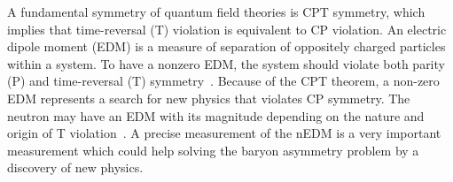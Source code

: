 
A fundamental symmetry of quantum field theories is CPT symmetry, which implies that time-reversal (T) violation is equivalent to CP violation.  An electric dipole moment (EDM) is a measure of separation of oppositely charged particles within a system. To have a nonzero EDM, the system should violate both parity (P) and time-reversal (T) symmetry~\cite{edm_reason}. Because of the CPT theorem, a non-zero EDM represents a search for new physics that violates CP symmetry. The neutron may have an EDM with its magnitude depending on the nature and origin of T violation~\cite{nEDM_reason}. A precise measurement of the nEDM is a very important measurement which could help solving the baryon asymmetry problem by a discovery of new physics.




